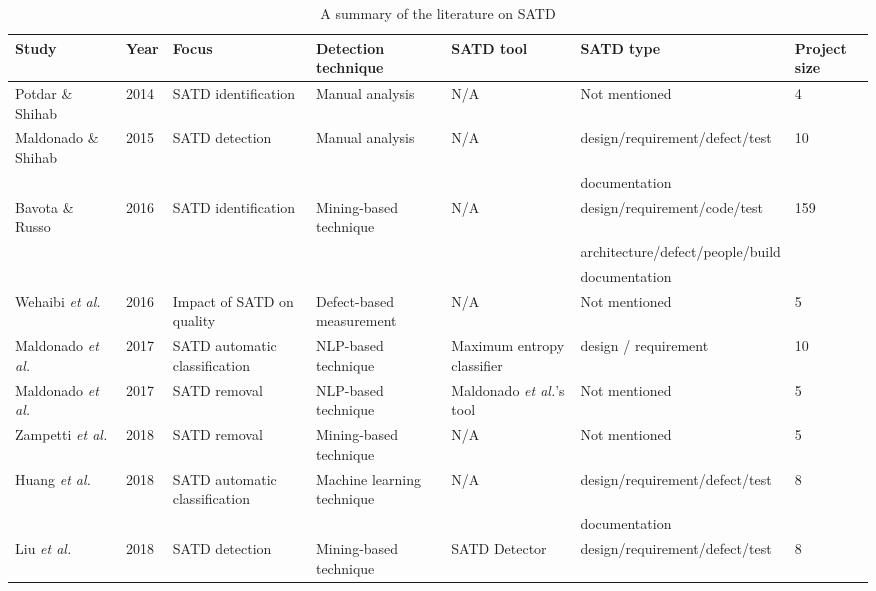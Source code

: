\documentclass[3p]{elsarticle}
\begin{document}
\begin{table*}
  \centering
	 \caption{A summary of the literature on SATD}
	 \label{Table:satd in Related Work}
\begin{adjustbox}{width=1.0\textwidth,center}
\begin{tabular}{|l|l|l|l|l|l|l|}\hline
\bfseries Study & \bfseries Year & \bfseries Focus & \bfseries Detection technique & \bfseries SATD tool & \bfseries SATD type & \bfseries Project size  \\ \hline
Potdar \& Shihab \cite{potdar2014exploratory} & 2014 & SATD identification & Manual analysis & N/A &  Not mentioned & 4   \\ \hline
Maldonado \& Shihab \cite{Maldonado2015} & 2015 & SATD detection & Manual analysis & N/A & design/requirement/defect/test & 10  \\ 
& & & & & documentation & \\ \hline
Bavota \& Russo \cite{bavota2016large} & 2016 & SATD identification & Mining-based technique & N/A & design/requirement/code/test & 159 \\ 
& & & & & architecture/defect/people/build & \\
& & & & & documentation & \\ \hline 
Wehaibi \textit{et al.} \cite{wehaibi2016examining} & 2016 & Impact of SATD on quality & Defect-based measurement & N/A & Not mentioned & 5  \\ \hline
Maldonado \textit{et al.} \cite{Maldonado2017-1} & 2017 & SATD automatic classification  & NLP-based technique & Maximum entropy classifier & design / requirement & 10  \\ \hline
Maldonado \textit{et al.} \cite{Maldonado2017-2} & 2017 & SATD removal & NLP-based technique & Maldonado \textit{et al.}'s tool & Not mentioned & 5  \\ \hline
Zampetti \textit{et al.} \cite{Zampetti} & 2018 & SATD removal & Mining-based technique & N/A & Not mentioned & 5  \\ \hline
Huang \textit{et al.} \cite{Huang} & 2018 & SATD automatic classification  & Machine learning technique & N/A & design/requirement/defect/test & 8  \\ 
& & & & & documentation & \\ \hline
Liu \textit{et al.} \cite{liu2018satd} & 2018 & SATD detection & Mining-based technique & SATD Detector & design/requirement/defect/test & 8  \\ 

\end{tabular}
\end{adjustbox}
\end{table*}
\end{document}
